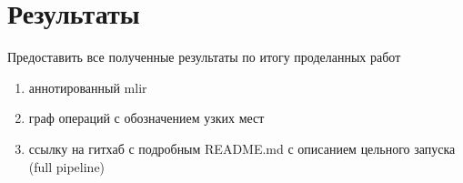 \section{Результаты}
\label{sec:Chapter5} 

Предоставить все полученные результаты по итогу проделанных работ

\begin{enumerate}
    \item аннотированный mlir
    \item граф операций с обозначением узких мест
    \item ссылку на гитхаб с подробным README.md с описанием цельного запуска (full pipeline)
\end{enumerate}

\newpage

